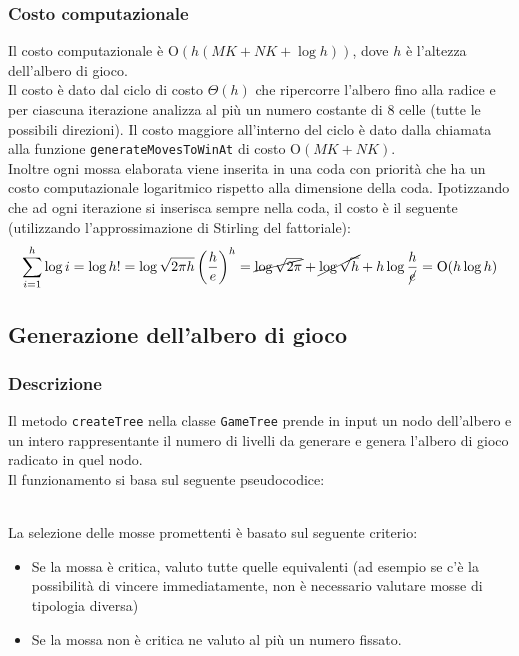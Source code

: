 \documentclass[11pt]{article}
\begin{document}
\subsubsection*{Costo computazionale}
Il costo computazionale è O$(h(MK+NK+\log h))$, dove $h$ è l'altezza dell'albero di gioco.\\
Il costo è dato dal ciclo di costo $\Theta(h)$ che ripercorre l'albero fino alla radice e per ciascuna iterazione analizza al più un numero costante di 8 celle (tutte le possibili direzioni). Il costo maggiore all'interno del ciclo è dato dalla chiamata alla funzione \texttt{generateMovesToWinAt} di costo O$(MK+NK)$.\\
Inoltre ogni mossa elaborata viene inserita in una coda con priorità che ha un costo computazionale logaritmico rispetto alla dimensione della coda. Ipotizzando che ad ogni iterazione si inserisca sempre nella coda, il costo è il seguente (utilizzando l'approssimazione di Stirling del fattoriale):
\begin{align*}
\sum_{i=1}^{h} \log i = \log h! = \log \sqrt{2\pi h} \left(\dfrac{h}{e}\right)^h = \cancel{\log \sqrt{2 \pi}} + \cancel{\log \sqrt{h}} + h \log \dfrac{h}{\cancel{e}} = \text{O}(h \log h)
\end{align*}

\subsection*{Generazione dell'albero di gioco}
\subsubsection*{Descrizione}
Il metodo \texttt{createTree} nella classe \texttt{GameTree} prende in input un nodo dell'albero e un intero rappresentante il numero di livelli da generare e genera l'albero di gioco radicato in quel nodo.\\
Il funzionamento si basa sul seguente pseudocodice:
\begin{algorithm*}
\SetAlgoLined
{}
\end{algorithm*}\\
La selezione delle mosse promettenti è basato sul seguente criterio:
\begin{itemize}
\setlength\itemsep{0.05cm}
	\item Se la mossa è critica, valuto tutte quelle equivalenti (ad esempio se c'è la possibilità di vincere immediatamente, non è necessario valutare mosse di tipologia diversa)
	\item Se la mossa non è critica ne valuto al più un numero fissato.
\end{itemize}
\end{document}
